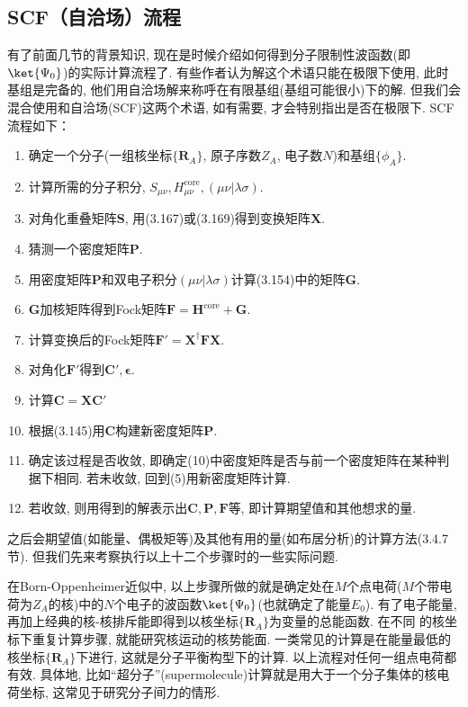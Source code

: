 \subsection{SCF（自洽场）流程}
有了前面几节的背景知识, 
现在是时候介绍如何得到分子限制性波函数(即$\ket{\Psi_0}$)的实际计算流程了. 
有些作者认为\hft 解这个术语只能在\hft 极限下使用, 
此时基组是完备的, 
他们用自洽场解来称呼在有限基组(基组可能很小)下的解. 
但我们会混合使用\hft 和自洽场(SCF)这两个术语, 
如有需要, 
才会特别指出是否在\hft 极限下. 
SCF流程如下：
\begin{enumerate}[1.]
	\item 确定一个分子(一组核坐标$\{\mathbf{R}_A\}$, 原子序数$Z_A$, 电子数$N$)和基组$\{\phi_A\}$.
	\item 计算所需的分子积分, $S_{\mu\nu},H_{\mu\nu}^\mathrm{core}, (\mu\nu|\lambda\sigma)$.
	\item 对角化重叠矩阵$\mathbf{S}$, 用(3.167)或(3.169)得到变换矩阵$\mathbf{X}$.
	\item 猜测一个密度矩阵$\mathbf{P}$.
	\item 用密度矩阵$\mathbf{P}$和双电子积分$(\mu\nu|\lambda\sigma)$计算(3.154)中的矩阵$\mathbf{G}$.
	\item $\mathbf{G}$加核\ha 矩阵得到Fock矩阵$\mathbf{F=H}^\mathrm{core}+\mathbf{G}$.
	\item 计算变换后的Fock矩阵$\mathbf{F'=X^\dagger FX}$.
	\item 对角化$\mathbf{F'}$得到$\mathbf{C'},\bm{\epsilon}$.
	\item 计算$\mathbf{C}=\mathbf{XC'}$
	\item 根据(3.145)用$\mathbf{C}$构建新密度矩阵$\mathbf{P}$.
	\item 确定该过程是否收敛, 即确定(10)中密度矩阵是否与前一个密度矩阵在某种判据下相同. 若未收敛, 回到(5)用新密度矩阵计算.
	\item 若收敛, 则用得到的解表示出$\mathbf{C,P,F}$等, 即计算期望值和其他想求的量.
\end{enumerate}
之后会期望值(如能量、偶极矩等)及其他有用的量(如布居分析)的计算方法(3.4.7节). 
但我们先来考察执行以上十二个步骤时的一些实际问题.


在Born-Oppenheimer近似中, 
以上步骤所做的就是确定处在$M$个点电荷($M$个带电荷为$Z_A$的核)中的$N$个电子的波函数$\ket{\Psi_0}$(也就确定了能量$E_0$). 
有了电子能量, 
再加上经典的核-核排斥能即得到以核坐标$\{\mathbf{R}_A\}$为变量的总能函数. 
在不同 的核坐标下重复计算步骤, 
就能研究核运动的核势能面. 
一类常见的计算是在能量最低的核坐标$\{\mathbf{R}_A\}$下进行, 
这就是分子平衡构型下的计算. 
以上流程对任何一组点电荷都有效. 
具体地, 
比如``超分子''(supermolecule)计算就是用大于一个分子集体的核电荷坐标, 
这常见于研究分子间力的情形.


